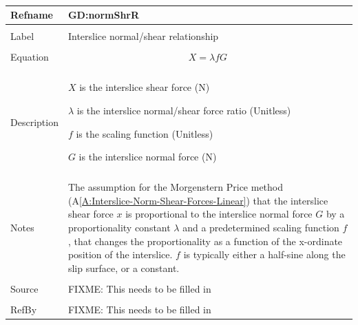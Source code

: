 \documentclass[12pt]{article}
\begin{document}
~\newline
\noindent \begin{minipage}{\textwidth}
\begin{tabular}{p{} p{}}
\toprule \textbf{Refname} & \textbf{GD:normShrR}
\label{GD:normShrR}
\\ \midrule \\
Label & Interslice normal/shear relationship
\\ \midrule \\
Equation & \begin{dmath}
           X=λ f G
           \end{dmath}
\\ \midrule \\
Description & \begin{symbDescription}
              \item{$X$ is the interslice shear force (N)}
              \item{$λ$ is the interslice normal/shear force ratio (Unitless)}
              \item{$f$ is the scaling function (Unitless)}
              \item{$G$ is the interslice normal force (N)}
              \end{symbDescription}
\\ \midrule \\
Notes & The assumption for the Morgenstern Price method (A\ref{A:Interslice-Norm-Shear-Forces-Linear}) that the interslice shear force $x$ is proportional to the interslice normal force $G$ by a proportionality constant $λ$ and a predetermined scaling function $f$, that changes the proportionality as a function of the x-ordinate position of the interslice. $f$ is typically either a half-sine along the slip surface, or a constant.
\\ \midrule \\
Source & FIXME: This needs to be filled in
\\ \midrule \\
RefBy & FIXME: This needs to be filled in
\\ \bottomrule \end{tabular}
\end{minipage}\\
~\newline
\end{document}
